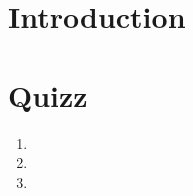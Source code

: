 \documentclass[ds]{sujet}
\begin{document}
\formation{} 
\matiere{}  
\auteur{} 
\def\SujetClsNumero{1}
\section*{Introduction}

\section{Quizz}
\begin{enumerate}
\item
\item
\item
\end{enumerate}



\end{document}
